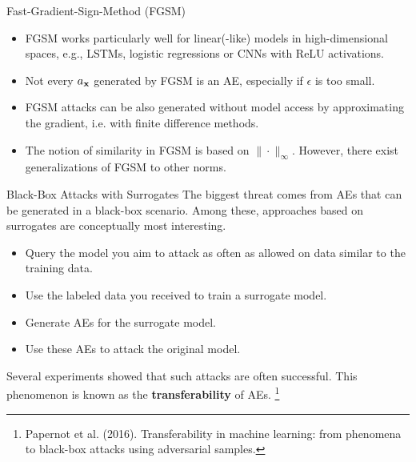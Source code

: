 \documentclass[11pt,compress,t,notes=noshow, xcolor=table]{beamer}
\begin{document}
\begin{vbframe}{Fast-Gradient-Sign-Method (FGSM)}
\begin{itemize}
    \item FGSM works particularly well for linear(-like) models in high-dimensional spaces, e.g., LSTMs, logistic regressions or CNNs with ReLU activations.
    \item Not every $a_{\xv}$ generated by FGSM is an AE, especially if $\epsilon$ is too small.
    \item FGSM attacks can be also generated without model access by approximating the gradient, i.e. with finite difference methods.
    \item The notion of similarity in FGSM is based on $\|\cdot\|_{\infty}$. However, there exist generalizations of FGSM to other norms.
\end{itemize}
\end{vbframe}


\begin{vbframe}{Black-Box Attacks with Surrogates}
The biggest threat comes from AEs that can be generated in a black-box scenario. Among these, approaches based on surrogates are conceptually most interesting.
\begin{itemize}
    \item Query the model you aim to attack as often as allowed on data similar to the training data.
    \item Use the labeled data you received to train a surrogate model.%
    \item %
    Generate AEs for the surrogate model.%
    \item Use these AEs to attack the original model.
\end{itemize}
Several experiments showed that such attacks are often successful. %
This phenomenon is known as the \textbf{transferability} of AEs.
%
%
\footnote[frame]{Papernot et al. (2016). Transferability in machine learning: from phenomena to black-box attacks using adversarial samples.}
\end{vbframe}
\end{document}
